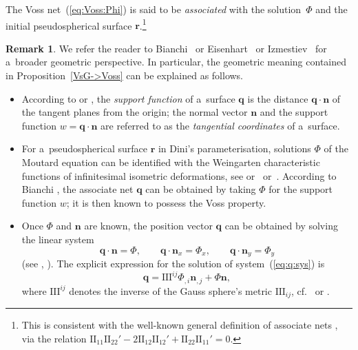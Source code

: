 \documentclass[pdftex]{sigma}
\let\ve\mathbf
\def\eqref#1{{\rm(\ref{#1})}}
\numberwithin{equation}{section}
\theoremstyle{definition}
\newtheorem{Remark}[Theorem]{Remark}
\begin{document}
The Voss net~\eqref{eq:Voss:Phi} is said to be {\it associated} with the
solution~$\Phi$ and the initial pseudospherical surface $\ve r$.\footnote{This is consistent with the well-known general definition of
associate nets \cite[Section~225]{Bia-II}, \cite[Section~155]{LPE-1909}
via the relation
$\mathrm{II}_{11} \mathrm{II}_{22}' - 2 \mathrm{II}_{12} \mathrm{II}_{12}' + \mathrm{II}_{22} \mathrm{II}_{11}' = 0$.}

\begin{Remark} \label{rem:isodef}
We refer the reader to Bianchi~\cite{Bia-I,Bia-II} or
Eisenhart~\cite{LPE-1909} or Izme\-stiev~\cite{Izm}
for a~broader geometric perspective.
In particular, the geometric meaning contained in
Proposition~\ref{VsG->Voss} can be explained as follows.
\begin{itemize}\itemsep=0pt
\item[(1)] According to \cite[Section~81]{Bia-I} or \cite[Section~67]{LPE-1909},
the {\it support function} of a~surface $\ve q$ is the
distance $\ve q \cdot \ve n$ of the tangent planes from the origin;
the normal vector $\ve n$ and the support function
$w = \ve q \cdot \ve n$ are referred to as the {\it tangential coordinates}
of a~surface.

\item[(2)] For a~pseudospherical surface $\ve r$ in Dini's parameterisation,
solutions $\Phi$ of the Moutard equation can be identified with
the Weingarten characteristic functions of infinitesimal isometric
deformations, see \cite[Chapter~XV, Section~226, case~$1^\circ$]{Bia-II}
or~\cite[Chapter~XI]{LPE-1909}
or~\hbox{\cite[Section~2.5]{Izm}}.
According to Bianchi \hbox{\cite[Section~225]{Bia-II}}, the associate net
$\ve q$ can be obtained by taking $\Phi$ for the support function $w$;
it is then known to possess the Voss property.

\item[(3)] Once $\Phi$ and $\ve n$ are known,
the position vector $\ve q$ can be obtained by solving the linear system
\begin{equation}
\label{eq:q:sys}
\ve q \cdot \ve n = \Phi, \qquad
\ve q \cdot \ve n_x = \Phi_x, \qquad
\ve q \cdot \ve n_y = \Phi_y
\end{equation}
(see \cite[Section~81, equations~(a) and~(b)]{Bia-I},
\cite[Section~67, equations~(29) and~(30)]{LPE-1909}).
The explicit expression for the solution of system~\eqref{eq:q:sys} is
\begin{equation}
\label{eq:q:nw}
\ve q = \mathrm{III}^{ij} \Phi_{,i} \ve n_{,j} + \Phi \ve n,
\end{equation}
where $\mathrm{III}^{ij}$ denotes the inverse of the Gauss sphere's metric
$\mathrm{III}_{ij}$,
cf.\ \cite[Chapter~V, Section~81, equation~(34)]{Bia-I} or
\cite[Section~67, equation~(32)]{LPE-1909}.


\end{itemize}
\end{Remark}
\end{document}
